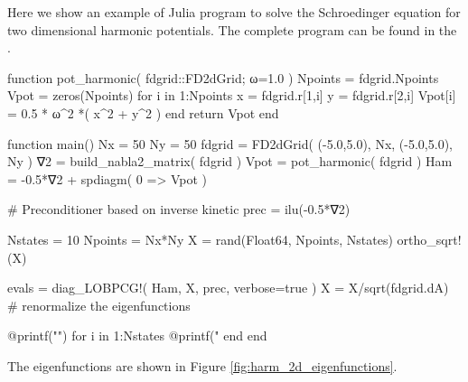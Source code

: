 Here we show an example of Julia program to solve the Schroedinger equation for two
dimensional harmonic potentials. The complete program can be found in the
.

\begin{juliacode}
function pot_harmonic( fdgrid::FD2dGrid; ω=1.0 )
    Npoints = fdgrid.Npoints
    Vpot = zeros(Npoints)
    for i in 1:Npoints
        x = fdgrid.r[1,i]
        y = fdgrid.r[2,i]
        Vpot[i] = 0.5 * ω^2 *( x^2 + y^2 )
    end
    return Vpot
end

function main()
    Nx = 50
    Ny = 50
    fdgrid = FD2dGrid( (-5.0,5.0), Nx, (-5.0,5.0), Ny )
    ∇2 = build_nabla2_matrix( fdgrid )
    Vpot = pot_harmonic( fdgrid )
    Ham = -0.5*∇2 + spdiagm( 0 => Vpot )

    # Preconditioner based on inverse kinetic
    prec = ilu(-0.5*∇2)

    Nstates = 10
    Npoints = Nx*Ny
    X = rand(Float64, Npoints, Nstates)
    ortho_sqrt!(X)
    
    evals = diag_LOBPCG!( Ham, X, prec, verbose=true )
    X = X/sqrt(fdgrid.dA) # renormalize the eigenfunctions

    @printf("\n\nEigenvalues\n")
    for i in 1:Nstates
        @printf("%
    end
end
\end{juliacode}


The eigenfunctions are shown in Figure \ref{fig:harm_2d_eigenfunctions}.

